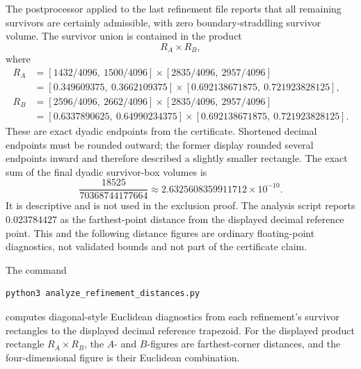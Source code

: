 \documentclass[11pt]{article}
\begin{document}
The postprocessor applied to the last refinement file reports that all
remaining survivors are certainly admissible, with zero boundary-straddling
survivor volume.  The survivor union is contained in the product
\[
  R_A\times R_B,
\]
where
\[
\begin{aligned}
R_A&=[1432/4096,\ 1500/4096]\times[2835/4096,\ 2957/4096]\\
&=[0.349609375,\ 0.3662109375]
  \times[0.692138671875,\ 0.721923828125],\\
R_B&=[2596/4096,\ 2662/4096]\times[2835/4096,\ 2957/4096]\\
&=[0.6337890625,\ 0.64990234375]
  \times[0.692138671875,\ 0.721923828125].
\end{aligned}
\]
These are exact dyadic endpoints from the certificate.  Shortened decimal
endpoints must be rounded outward; the former display rounded several endpoints
inward and therefore described a slightly smaller rectangle.
The exact sum of the final dyadic survivor-box volumes is
\[
  \frac{18525}{70368744177664}
  \approx 2.6325608359911712\times 10^{-10}.
\]
It is descriptive and is not used in the exclusion proof.
The analysis script reports \(0.023784427\) as the farthest-point distance from
the displayed decimal reference point.  This and the following distance
figures are ordinary floating-point diagnostics, not validated bounds and not
part of the certificate claim.

The command
\begin{lstlisting}
python3 analyze_refinement_distances.py
\end{lstlisting}
computes diagonal-style Euclidean diagnostics from each refinement's survivor
rectangles to the displayed decimal reference trapezoid.  For the displayed
product rectangle \(R_A\times R_B\), the \(A\)- and \(B\)-figures are
farthest-corner distances, and the four-dimensional figure is their Euclidean
combination.
\end{document}
